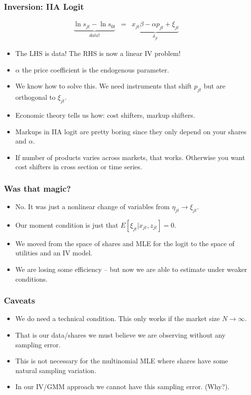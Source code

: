 \documentclass[xcolor=pdftex,dvipsnames,table,mathserif]{beamer}
\begin{document}
\begin{frame}
\frametitle{Inversion: IIA Logit}
\begin{eqnarray*}
\underbrace{\ln s_{jt}- \ln s_{0t}}_{data!}&=& \underbrace{x_{jt} \beta -\alpha p_{jt} +  \xi_{jt}}_{\delta_{jt}}
\end{eqnarray*}
 \begin{itemize}
\item The LHS is data! The RHS is now a linear IV problem!
\item $\alpha$ the price coefficient is the endogenous parameter.
\item We know how to solve this. We need instruments that shift $p_{jt}$ but are orthogonal to $\xi_{jt}$.
\item Economic theory tells us how: cost shifters, markup shifters.
\item Markups in IIA logit are pretty boring since they only depend on your shares and $\alpha$.
\item If number of products varies across markets, that works. Otherwise you want cost shifters in cross section or time series.
 \end{itemize}
\end{frame}


\begin{frame}
\frametitle{Was that magic?}
\begin{itemize}
\item No. It was just a nonlinear change of variables from $\eta_{jt} \rightarrow \xi_{jt}$.
\item Our moment condition is just that $E[\xi_{jt} | x_{jt}, z_{jt}]=0$.
\item We moved from the space of shares and MLE for the logit to the space of utilities and an IV model.
\item We are losing some efficiency -- but now we are able to estimate under weaker conditions.
 \end{itemize}
\end{frame}

\begin{frame}
\frametitle{Caveats}
\begin{itemize}
\item We do need a technical condition. This only works if the market size $N \rightarrow \infty$.
\item That is our data/shares we must believe we are observing without any sampling error.
\item This is not necessary for the multinomial MLE where shares have some natural sampling variation.
\item In our IV/GMM approach we cannot have this sampling error. (Why?).
 \end{itemize}
\end{frame}
\end{document}
